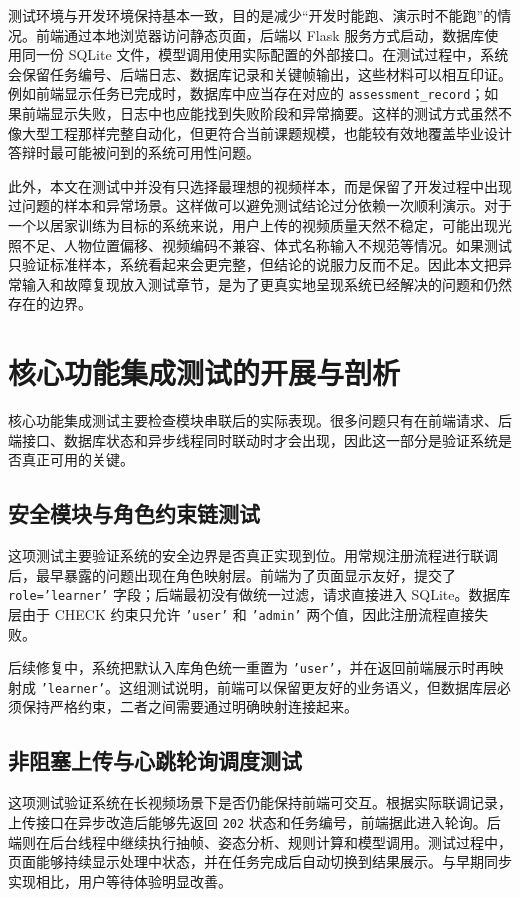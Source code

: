 \documentclass[UTF8,twoside]{ctexrep}
\makeatletter
\def@NAT@last@yr{\@citea}%
\def@NAT@last@yr{-\NAT@penalty}%
\makeatother
\begin{document}
测试环境与开发环境保持基本一致，目的是减少“开发时能跑、演示时不能跑”的情况。前端通过本地浏览器访问静态页面，后端以 Flask 服务方式启动，数据库使用同一份 SQLite 文件，模型调用使用实际配置的外部接口。在测试过程中，系统会保留任务编号、后端日志、数据库记录和关键帧输出，这些材料可以相互印证。例如前端显示任务已完成时，数据库中应当存在对应的 \texttt{assessment\_record}；如果前端显示失败，日志中也应能找到失败阶段和异常摘要。这样的测试方式虽然不像大型工程那样完整自动化，但更符合当前课题规模，也能较有效地覆盖毕业设计答辩时最可能被问到的系统可用性问题。

此外，本文在测试中并没有只选择最理想的视频样本，而是保留了开发过程中出现过问题的样本和异常场景。这样做可以避免测试结论过分依赖一次顺利演示。对于一个以居家训练为目标的系统来说，用户上传的视频质量天然不稳定，可能出现光照不足、人物位置偏移、视频编码不兼容、体式名称输入不规范等情况。如果测试只验证标准样本，系统看起来会更完整，但结论的说服力反而不足。因此本文把异常输入和故障复现放入测试章节，是为了更真实地呈现系统已经解决的问题和仍然存在的边界。

\section{核心功能集成测试的开展与剖析}

核心功能集成测试主要检查模块串联后的实际表现。很多问题只有在前端请求、后端接口、数据库状态和异步线程同时联动时才会出现，因此这一部分是验证系统是否真正可用的关键。

\subsection{安全模块与角色约束链测试}
这项测试主要验证系统的安全边界是否真正实现到位。用常规注册流程进行联调后，最早暴露的问题出现在角色映射层。前端为了页面显示友好，提交了 \texttt{role='learner'} 字段；后端最初没有做统一过滤，请求直接进入 SQLite。数据库层由于 CHECK 约束只允许 \texttt{'user'} 和 \texttt{'admin'} 两个值，因此注册流程直接失败。

后续修复中，系统把默认入库角色统一重置为 \texttt{'user'}，并在返回前端展示时再映射成 \texttt{'learner'}。这组测试说明，前端可以保留更友好的业务语义，但数据库层必须保持严格约束，二者之间需要通过明确映射连接起来。

\subsection{非阻塞上传与心跳轮询调度测试}
这项测试验证系统在长视频场景下是否仍能保持前端可交互。根据实际联调记录，上传接口在异步改造后能够先返回 \texttt{202} 状态和任务编号，前端据此进入轮询。后端则在后台线程中继续执行抽帧、姿态分析、规则计算和模型调用。测试过程中，页面能够持续显示处理中状态，并在任务完成后自动切换到结果展示。与早期同步实现相比，用户等待体验明显改善。
\end{document}
